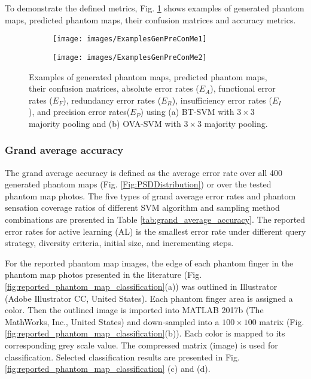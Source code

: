 To demonstrate the defined metrics, Fig. \ref{fig:ExamplesRealPredictedConfMat} shows examples of generated phantom maps, predicted phantom maps, their confusion matrices and accuracy metrics.

\begin{figure}[htbp]
    \centering
    \begin{subfigure}[b]{0.43\textwidth}
        \texttt{[image: images/ExamplesGenPreConMe1]}
        \caption{}
    \end{subfigure}
    \begin{subfigure}[b]{0.43\textwidth}
        \texttt{[image: images/ExamplesGenPreConMe2]}
        \caption{}
    \end{subfigure}
    \caption{Examples of generated phantom maps, predicted phantom maps, their confusion matrices, absolute error rates ($E_A$), functional error rates ($E_F$), redundancy error rates ($E_R$), insufficiency error rates ($E_I$), and precision error rates($E_P$) using (a) BT-SVM with $3 \times 3$ majority pooling and (b) OVA-SVM with $3 \times 3$ majority pooling. }
    \label{fig:ExamplesRealPredictedConfMat}
\end{figure} 
 


\subsubsection{Grand average accuracy}
\label{chap2:subsubsec:grand_average_accuracy}
The grand average accuracy is defined as the average error rate over all 400 generated phantom maps (Fig. \ref{Fig:PSDDistribution}) or over the tested phantom map photos. The five types of grand average error rates and phantom sensation coverage ratios of different SVM algorithm and sampling method combinations are presented in Table \ref{tab:grand_average_accuracy}. The reported error rates for active learning (AL) is the smallest error rate under different query strategy, diversity criteria, initial size, and incrementing steps.  

For the reported phantom map images, the edge of each phantom finger in the phantom map photos presented in the literature (Fig. \ref{fig:reported_phantom_map_classification}(a)) was outlined in Illustrator (Adobe Illustrator CC, United States). Each phantom finger area is assigned a color. Then the outlined image is imported into MATLAB 2017b (The MathWorks, Inc., United States) and down-sampled into a $100 \times 100$ matrix (Fig. \ref{fig:reported_phantom_map_classification}(b)). Each color is mapped to its corresponding grey scale value. The compressed matrix (image) is used for classification. Selected classification results are presented in  Fig. \ref{fig:reported_phantom_map_classification}  (c) and (d). 

